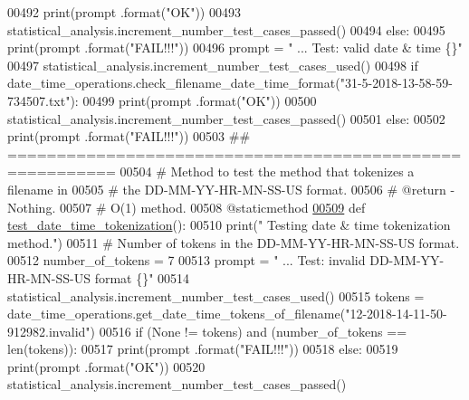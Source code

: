 \begin{DoxyCode}
00492             print(prompt .format(\textcolor{stringliteral}{"OK"}))
00493             statistical\_analysis.increment\_number\_test\_cases\_passed()
00494         \textcolor{keywordflow}{else}:
00495             print(prompt .format(\textcolor{stringliteral}{"FAIL!!!"}))
00496         prompt = \textcolor{stringliteral}{"  ... Test: valid date & time             \{\}"}
00497         statistical\_analysis.increment\_number\_test\_cases\_used()
00498         \textcolor{keywordflow}{if} date\_time\_operations.check\_filename\_date\_time\_format(\textcolor{stringliteral}{"31-5-2018-13-58-59-734507.txt"}):
00499             print(prompt .format(\textcolor{stringliteral}{"OK"}))
00500             statistical\_analysis.increment\_number\_test\_cases\_passed()
00501         \textcolor{keywordflow}{else}:
00502             print(prompt .format(\textcolor{stringliteral}{"FAIL!!!"}))
00503     \textcolor{comment}{## =========================================================}
00504     \textcolor{comment}{#   Method to test the method that tokenizes a filename in}
00505     \textcolor{comment}{#       the DD-MM-YY-HR-MN-SS-US format.}
00506     \textcolor{comment}{#   @return - Nothing.}
00507     \textcolor{comment}{#   O(1) method.}
00508     @staticmethod
\hypertarget{date__time__processing__tester_8py_source_l00509}{}\hyperlink{classutilities_1_1date__time__processing__tester_1_1date__time__operations__tester_ad2310ba49049da0632ac87e93dbecd4f}{00509}     \textcolor{keyword}{def }\hyperlink{classutilities_1_1date__time__processing__tester_1_1date__time__operations__tester_ad2310ba49049da0632ac87e93dbecd4f}{test\_date\_time\_tokenization}():
00510         print(\textcolor{stringliteral}{" Testing date & time tokenization method."})
00511         \textcolor{comment}{# Number of tokens in the DD-MM-YY-HR-MN-SS-US format.}
00512         number\_of\_tokens = 7
00513         prompt = \textcolor{stringliteral}{"  ... Test: invalid DD-MM-YY-HR-MN-SS-US format       \{\}"}
00514         statistical\_analysis.increment\_number\_test\_cases\_used()
00515         tokens = date\_time\_operations.get\_date\_time\_tokens\_of\_filename(\textcolor{stringliteral}{"12-2018-14-11-50-912982.invalid"})
00516         \textcolor{keywordflow}{if} (\textcolor{keywordtype}{None} != tokens) \textcolor{keywordflow}{and} (number\_of\_tokens == len(tokens)):
00517             print(prompt .format(\textcolor{stringliteral}{"FAIL!!!"}))
00518         \textcolor{keywordflow}{else}:
00519             print(prompt .format(\textcolor{stringliteral}{"OK"}))
00520             statistical\_analysis.increment\_number\_test\_cases\_passed()

\end{DoxyCode}
